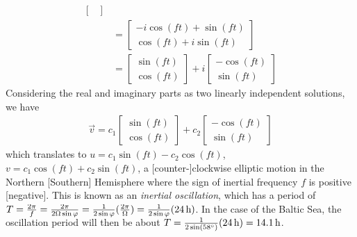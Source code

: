 \begin{solution}
\begin{align*}
\begin{bmatrix}
\end{bmatrix} \\
&= \begin{bmatrix}
-i \cos(ft) + \sin(ft) \\
\cos(ft) + i \sin(ft)
\end{bmatrix} \\
&= 
\begin{bmatrix}
\sin(ft) \\
\cos(ft) 
\end{bmatrix}
+i 
\begin{bmatrix}
-\cos(ft) \\
\sin(ft) 
\end{bmatrix}
\end{align*}
Considering the real and imaginary parts as two linearly independent solutions, we have \begin{align*}
\vec{v} = c_1\begin{bmatrix}
\sin(ft) \\
\cos(ft) 
\end{bmatrix} + c_2\begin{bmatrix}
-\cos(ft) \\
\sin(ft) 
\end{bmatrix}    
\end{align*}
which translates to $u = c_1\sin(ft) - c_2\cos(ft)$, $v = c_1\cos(ft) + c_2\sin(ft)$, a [counter-]clockwise elliptic motion in the Northern [Southern] Hemisphere where the sign of inertial frequency $f$ is positive [negative]. This is known as an \textit{inertial oscillation}, which has a period of $T = \smash{\frac{2\pi}{f}} = \smash{\frac{2\pi}{2\Omega \sin \varphi}} = \smash{\frac{1}{2 \sin \varphi}(\frac{2\pi}{\Omega})} = \smash{\frac{1}{2 \sin \varphi}}(\SI{24}{\hour})$. In the case of the Baltic Sea, the oscillation period will then be about $T = \smash{\frac{1}{2 \sin(\SI{58}{\degree})}}(\SI{24}{\hour}) = \SI{14.1}{\hour}$.
\end{solution}


